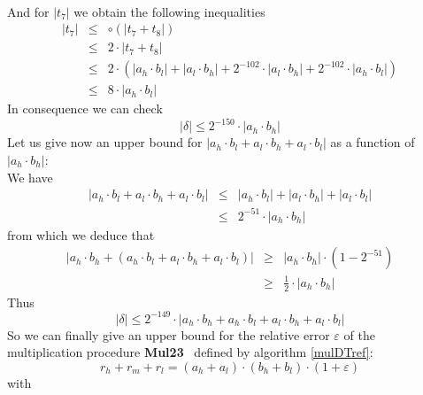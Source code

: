 \documentclass[a4paper,10pt,twoside]{article}
\newenvironment{proof}[1][Proof]{\begin{trivlist}
\item[\hskip \labelsep {\bfseries #1}]}{\end{trivlist}}
\newcommand{\hi}{\ensuremath{\mathit{h}}}
\newcommand{\mi}{\ensuremath{\mathit{m}}}
\newcommand{\lo}{\ensuremath{\mathit{l}}}
\newcommand{\MulDT}{{\bf Mul23}}
\renewcommand{\epsilon}{\varepsilon}
\begin{document}
\begin{proof}
\begin{eqnarray*}
\end{eqnarray*}
And for $\left \vert t_7 \right \vert$ we obtain the following inequalities
\begin{eqnarray*}
\left \vert t_7 \right \vert & \leq & \circ \left( \left \vert t_7 + t_8 \right \vert \right) \\
& \leq & 2 \cdot \left \vert t_7 + t_8 \right \vert \\
& \leq & 2 \cdot \left(\left \vert a_\hi \cdot b_\lo \right \vert + 
                       \left \vert a_\lo \cdot b_\hi \right \vert + 
                       2^{-102} \cdot \left \vert a_\lo \cdot b_\hi \right \vert + 
                       2^{-102} \cdot \left \vert a_\hi \cdot b_\lo \right \vert \right) \\
& \leq & 8 \cdot \left \vert a_\hi \cdot b_\lo \right \vert
\end{eqnarray*}
In consequence we can check
$$\left \vert \delta \right \vert \leq 2^{-150} \cdot \left \vert a_\hi \cdot b_\hi \right \vert$$
Let us give now an upper bound for $\left \vert a_\hi \cdot b_\lo + a_\lo \cdot b_\hi + a_\lo \cdot b_\lo \right \vert$ as a function of
$\left \vert a_\hi \cdot b_\hi \right \vert$:\\
We have
\begin{eqnarray*}
\left \vert a_\hi \cdot b_\lo + a_\lo \cdot b_\hi + a_\lo \cdot b_\lo \right \vert & \leq & 
\left \vert a_\hi \cdot b_\lo \right \vert + \left \vert a_\lo \cdot b_\hi \right \vert + \left \vert a_\lo \cdot b_\lo \right \vert \\
& \leq & 2^{-51} \cdot \left \vert a_\hi \cdot b_\hi \right \vert
\end{eqnarray*}
from which we deduce that
\begin{eqnarray*}
\left \vert a_\hi \cdot b_\hi + \left( a_\hi \cdot b_\lo + a_\lo \cdot b_\hi + a_\lo \cdot b_\lo \right) \right \vert & \geq & 
\left \vert a_\hi \cdot b_\hi \right \vert \cdot \left( 1 - 2^{-51} \right) \\
& \geq & \frac{1}{2} \cdot \left \vert a_\hi \cdot b_\hi \right \vert
\end{eqnarray*}
Thus
$$\left \vert \delta \right \vert \leq 
2^{-149} \cdot \left \vert a_\hi \cdot b_\hi + a_\hi \cdot b_\lo + a_\lo \cdot b_\hi + a_\lo \cdot b_\lo \right \vert$$
So we can finally give an upper bound for the relative error $\epsilon$ of the multiplication procedure \MulDT~ 
defined by algorithm \ref{mulDTref}:
$$r_\hi + r_\mi + r_\lo = \left( a_\hi + a_\lo \right) \cdot \left( b_\hi + b_\lo \right) \cdot \left( 1 + \epsilon \right)$$
with

\end{proof}
\end{document}
